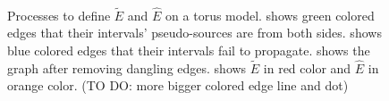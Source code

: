 \documentclass[a4paper,twoside]{article}
\begin{document}
\begin{figure}[h!]
	\centering		
	\hspace{10pt}
	\\
	\hspace{10pt}

	\caption[]{Processes to define $\tilde{E}$ and $\hat{E}$ on a torus model.  shows green colored edges that their intervals' pseudo-sources are from both sides.  shows blue colored edges that their intervals fail to propagate.  shows the graph after removing dangling edges.  shows $\tilde{E}$ in red color and $\hat{E}$ in orange color. (TO DO: more bigger colored edge line and dot)}
	\label{fig:fig-torus_edges_detected}
\end{figure}
\end{document}
